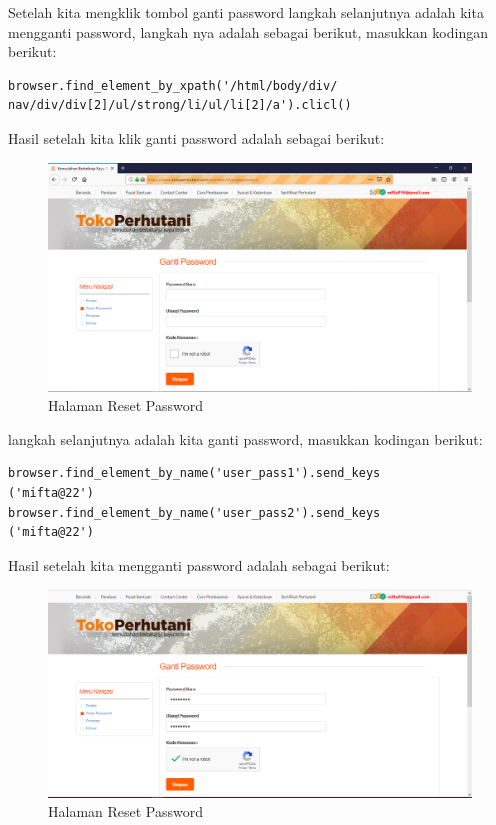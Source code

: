 Setelah kita mengklik tombol ganti password langkah selanjutnya adalah kita mengganti password, langkah nya adalah sebagai berikut, masukkan kodingan berikut: 
\begin{verbatim}
browser.find_element_by_xpath('/html/body/div/
nav/div/div[2]/ul/strong/li/ul/li[2]/a').clicl()
\end{verbatim} 

\newpage
Hasil setelah kita klik ganti password adalah sebagai berikut: 
\begin{figure}[h]
	\centering
	\includegraphics[scale=0.25]{figures/2GantiPassword}
	\caption{Halaman Reset Password}
\end{figure}

langkah selanjutnya adalah kita ganti password, masukkan kodingan berikut: 
\begin{verbatim}
browser.find_element_by_name('user_pass1').send_keys
('mifta@22')
browser.find_element_by_name('user_pass2').send_keys
('mifta@22')
\end{verbatim}

Hasil setelah kita mengganti password adalah sebagai berikut: 
\begin{figure}[h]
	\centering
	\includegraphics[scale=0.25]{figures/3GantiPassword}
	\caption{Halaman Reset Password}
\end{figure}

